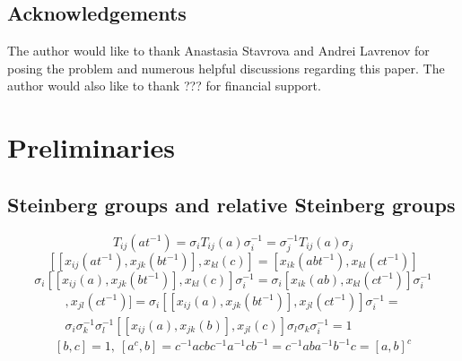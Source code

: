 \documentclass[oneside, 10pt]{amsart}
\numberwithin{equation}{section}
\numberwithin{lemma}{section}
\theoremstyle{definition}
\theoremstyle{remark}
\begin{document}
\subsection{Acknowledgements}
The author would like to thank Anastasia Stavrova and Andrei Lavrenov for posing the problem and numerous helpful discussions regarding this paper.
The author would also like to thank ??? for financial support.

\section{Preliminaries}
\begin{comment}
Our notation and conventions follows~\cite[\S~4]{Vav09}.
Let $\Phi$ be an irreducible root system with some fixed basis of simple roots $\Pi = \{\alpha_1, \ldots, \alpha_\ell\}$.
For a root $\alpha\in\Phi$ we denote by $m_i(\alpha)$ the $i$-th coefficient in the expansion of $\alpha$ in $\Pi$,
 i.\,e. $\alpha = \sum_{i=1}^n m_i(\alpha) \alpha_i$.

We denote by $\Phi^\vee$ the \emph{dual root system of $\Phi$} consisting of coroots $\alpha^\vee = 2\alpha/(\alpha, \alpha)$, $\alpha\in \Phi$.
As usual, $P(\Phi^\vee)$ denotes the lattice spanned by the \emph{fundamental weights $\varpi_i$},
 that are uniquely determined by relations $\langle\varpi_i, \alpha_j^\vee \rangle = (\varpi_i, \alpha_j) = \delta_{ij}.$ %
\end{comment}

\subsection{Steinberg groups and relative Steinberg groups}

\[ T_{ij}(at^{-1}) = \sigma_i T_{ij}(a) \sigma_i^{-1} = \sigma_j^{-1} T_{ij}(a) \sigma_j \]
\[ [[x_{ij}(a t^{-1}), x_{jk}(b t^{-1})],  x_{kl}(c)] = [x_{ik}(a b t^{-1}),  x_{kl}(c t^{-1})] \]
\[ \sigma_i [[x_{ij}(a), x_{jk}(b t^{-1})],  x_{kl}(c)] \sigma_i^{-1} =  \sigma_i [x_{ik}(a b),  x_{kl}(c t^{-1})] \sigma_i^{-1} \]
\begin{multline}
[[x_{ij}(at^{-1}), x_{jk}(bt^{-1})], x_{jl}(ct^{-1})] = \sigma_i [[ x_{ij}(a), x_{jk}(bt^{-1})], x_{jl}(ct^{-1})] \sigma_i^{-1} = \\
\sigma_i \sigma_k^{-1} \sigma_l^{-1} [[ x_{ij}(a), x_{jk}(b)], x_{jl}(c)] \sigma_l \sigma_k \sigma_i^{-1} = 1
\end{multline}
\[ [b, c] =1,\ [a^c, b] = c^{-1} a c b c^{-1} a^{-1} c b^{-1} =  c^{-1} a b  a^{-1} b^{-1} c = [a, b]^c \]
\end{document}
